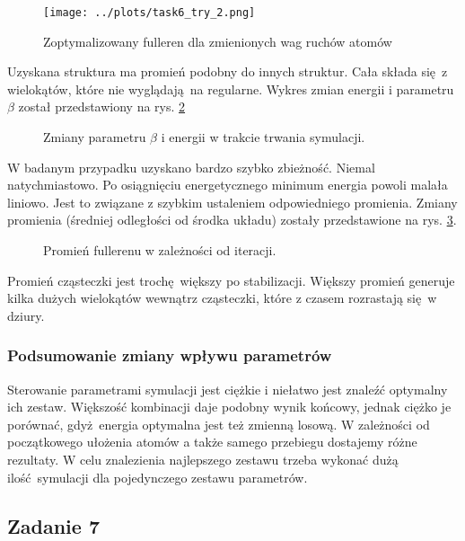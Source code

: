 \documentclass[a4paper,12pt]{article}
\begin{document}
	\begin{figure}[H]
		\centering
		\texttt{[image: ../plots/task6\_try\_2.png]}
		\caption{Zoptymalizowany fulleren dla zmienionych wag ruchów atomów}
		\label{task6_optim_2}
	\end{figure}
	
	\noindent Uzyskana struktura ma promień podobny do innych struktur. 
	Cała składa się z wielokątów, które nie wyglądają na regularne.
	Wykres zmian energii i parametru $\beta$ został przedstawiony na rys. \ref{task6_beta2}
	
	\begin{figure}[H]
		\centering
		
		\caption{Zmiany parametru $\beta$ i energii w trakcie trwania symulacji.}
		\label{task6_beta2}
	\end{figure}
	
	\noaka W badanym przypadku uzyskano bardzo szybko zbieżność. 
	Niemal natychmiastowo.
	Po osiągnięciu energetycznego minimum energia powoli malała liniowo.
	Jest to związane z szybkim ustaleniem odpowiedniego promienia. 
	Zmiany promienia (średniej odległości od środka układu) zostały przedstawione na rys. \ref{task6_r}.
	\begin{figure}[h]
		\centering
		
		\caption{Promień fullerenu w zależności od iteracji.}
		\label{task6_r}
	\end{figure}
	
	\noindent Promień cząsteczki jest trochę większy po stabilizacji.
	Większy promień generuje kilka dużych wielokątów wewnątrz cząsteczki, które z czasem rozrastają się w dziury.
	
	\subsubsection*{Podsumowanie zmiany wpływu parametrów}
	
	Sterowanie parametrami symulacji jest ciężkie i niełatwo jest znaleźć optymalny ich zestaw.
	Większość kombinacji daje podobny wynik końcowy, jednak ciężko je porównać, gdyż energia optymalna jest też zmienną losową.
	W zależności od początkowego ułożenia atomów a także samego przebiegu dostajemy różne rezultaty.
	W celu znalezienia najlepszego zestawu trzeba wykonać dużą ilość symulacji dla pojedynczego zestawu parametrów. 
	
	\subsection*{Zadanie 7}
	
\end{document}
